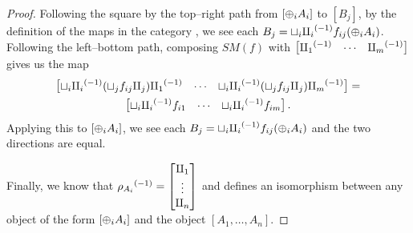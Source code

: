 \begin{proof}
  Following the square by the top--right path from $[\oplus_i A_i]$ to $[B_j]$, by the definition of
  the maps in the category \imatx, we see each $B_j = \sqcup_i{\amalg_{i}}^{(-1)} f_{ij}(\oplus_i A_i)$.
  Following the left--bottom path, composing $SM(f)$ with $\begin{bmatrix}{\amalg_{1}}^{(-1)}& \cdots
  &{\amalg_{m}}^{(-1)}\end{bmatrix}$ gives us the map
  \begin{multline*}
    \begin{bmatrix}\sqcup_i {\amalg_{i}}^{(-1)} (\sqcup_j f_{ij}\amalg_{j}){\amalg_{1}}^{(-1)}& \cdots
      &\sqcup_i {\amalg_{i}}^{(-1)} (\sqcup_j f_{ij}\amalg_{j}){\amalg_{m}}^{(-1)}\end{bmatrix} = \\
      \begin{bmatrix}\sqcup_i {\amalg_{i}}^{(-1)}  f_{i 1}& \cdots &\sqcup_i {\amalg_{i}}^{(-1)} f_{i m}\end{bmatrix}.
  \end{multline*}
  Applying this to $[\oplus_i A_i]$, we see each $B_j = \sqcup_i{\amalg_{i}}^{(-1)} f_{ij}(\oplus_i A_i)$ and the
  two directions are equal.

  Finally, we know that ${\rho_{A_i}}^{(-1)} = \begin{bmatrix}\amalg_{1}\\ \vdots \\\amalg_{n}\end{bmatrix}$
  and defines an isomorphism between any object of the form $[\oplus_i A_i]$ and the
  object $[A_1,\ldots,A_n]$.
\end{proof}
